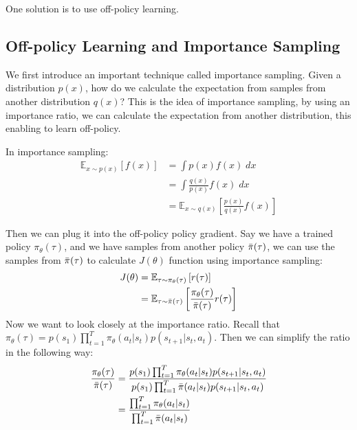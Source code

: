 One solution is to use off-policy learning.

\subsection{Off-policy Learning and Importance Sampling}
We first introduce an important technique called importance sampling. Given a distribution $p(x)$, how do we calculate the expectation from samples from another distribution $q(x)$? This is the idea of importance sampling, by using an importance ratio, we can calculate the expectation from another distribution, this enabling to learn off-policy. 

In importance sampling:
\begin{align*}
    \mathbb{E}_{x\sim p(x)}\left[f(x)\right] &= \int p(x)f(x)\;dx\\
    &=\int \frac{q(x)}{p(x)}f(x)\;dx\\
    &=\mathbb{E}_{x\sim q(x)}\left[\frac{p(x)}{q(x)}f(x)\right]
\end{align*}

Then we can plug it into the off-policy policy gradient. Say we have a trained policy $\pi_\theta(\tau)$, and we have samples from another policy $\Bar{\pi}(\tau)$, we can use the samples from $\Bar{\pi}(\tau)$ to calculate $J(\theta)$ function using importance sampling:
\begin{align*}
    J(\theta) &= \mathbb{E}_{\tau\sim\pi_\theta(\tau)}\left[r(\tau)\right]\\
    &= \mathbb{E}_{\tau\sim\Bar{\pi}(\tau)}\left[ \frac{\pi_\theta(\tau)}{\Bar{\pi}(\tau)} r(\tau)\right]
\end{align*}
Now we want to look closely at the importance ratio. Recall that $\pi_\theta(\tau) = p(s_1)\prod_{t=1}^T\pi_\theta(a_t|s_t)p(s_{t+1}|s_t,a_t)$. Then we can simplify the ratio in the following way:
\begin{align*}
\frac{\pi_\theta(\tau)}{\Bar{\pi}(\tau)} &=\frac{p(s_1)\prod_{t=1}^T\pi_\theta(a_t|s_t)p(s_{t+1}|s_t,a_t)}{p(s_1)\prod_{t=1}^T\Bar{\pi}(a_t|s_t)p(s_{t+1}|s_t,a_t)}\\
&= \frac{\prod_{t=1}^T\pi_\theta(a_t|s_t)}{\prod_{t=1}^T\Bar{\pi}(a_t|s_t)}
\end{align*}

